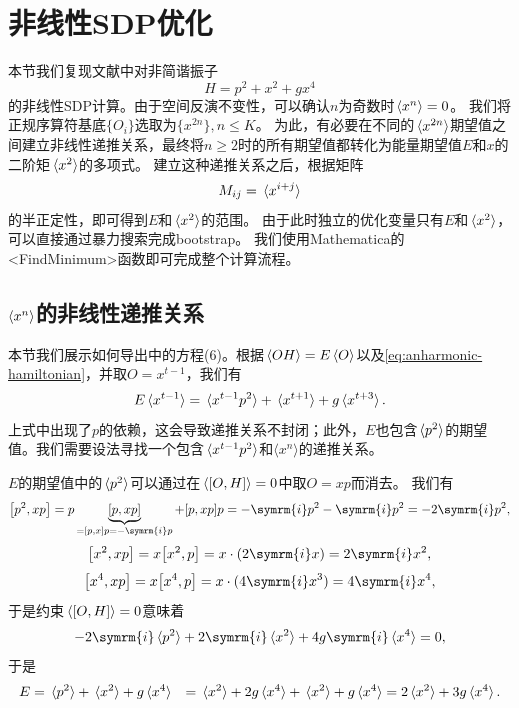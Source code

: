 \documentclass[oneside]{fduthesis}
\newcommand{\ii}{\symrm{i}}
\def\\{}%
\def\texttt#1{<#1>}%
\begin{document}
\section{非线性SDP优化}\label{sec:nonlinear-sdp-oscillator}

本节我们复现文献\parencite{han_matrix}中对非简谐振子
\begin{equation}
    H = p^2 + x^2 + g x^4
    \label{eq:anharmonic-hamiltonian}
\end{equation}
的非线性SDP计算。由于空间反演不变性，可以确认$n$为奇数时$\expval*{x^n} = 0$。
我们将正规序算符基底$\{O_i\}$选取为$\{x^{2n}\}, n \leq K$。
为此，有必要在不同的$\expval*{x^{2n}}$期望值之间建立非线性递推关系，最终将$n \geq 2$时的所有期望值都转化为能量期望值$E$和$x$的二阶矩$\expval*{x^2}$的多项式。
建立这种递推关系之后，根据矩阵
\begin{equation}
    M_{ij} = \expval*{x^{i + j}}
\end{equation}
的半正定性，即可得到$E$和$\expval*{x^2}$的范围。
由于此时独立的优化变量只有$E$和$\expval*{x^2}$，可以直接通过暴力搜索完成bootstrap。
我们使用Mathematica的\texttt{FindMinimum}函数即可完成整个计算流程。

\subsection{$\expval{x^n}$的非线性递推关系}

本节我们展示如何导出\parencite{han_matrix}中的方程(6)。根据$\expval*{OH} = E \expval*{O}$以及\eqref{eq:anharmonic-hamiltonian}，并取$O = x^{t-1}$，我们有
\begin{equation}
    E \expval*{x^{t-1}} = \expval*{x^{t-1} p^2} + \expval*{x^{t+1}} + g \expval*{x^{t+3}}.
    \label{eq:e-h-o-constraint-oscillator}
\end{equation}
上式中出现了$p$的依赖，这会导致递推关系不封闭；此外，$E$也包含$\expval*{p^2}$的期望值。我们需要设法寻找一个包含$\expval*{x^{t-1} p^2}$和$\langle x^n \rangle$的递推关系。

$E$的期望值中的$\expval*{p^2}$可以通过在$\expval*{\comm{O}{H}} = 0$中取$O = xp$而消去。
我们有
\[
    \comm{p^2}{xp} = p \underbrace{[p, xp]}_{= [p, x] p = - \ii p} + [p, xp] p = - \ii p^2 - \ii p ^2 = - 2 \ii p^2,
\]
\[
    \comm{x^2}{xp} = x\comm{x^2}{p} = x \cdot (2 \ii x) = 2 \ii x^2,
\]
\[
    \comm{x^4}{xp} = x \comm{x^4}{p} = x \cdot (4 \ii x^3) = 4 \ii x^4,
\]
于是约束$\expval*{\comm{O}{H}} = 0$意味着
\[
    - 2 \ii \expval*{p^2} + 2 \ii \expval*{x^2} + 4 g \ii \expval*{x^4} = 0,
\]
于是
\begin{equation}
    \begin{aligned}
        E &= \expval*{p^2} + \expval*{x^2} + g \expval*{x^4} \\
        &= \expval*{x^2} + 2 g \expval*{x^4} + \expval*{x^2} + g \expval*{x^4} = 2 \expval*{x^2} + 3 g \expval*{x^4}.
    \end{aligned}
    \label{eq:e-x-2-x-4}
\end{equation}
\end{document}

